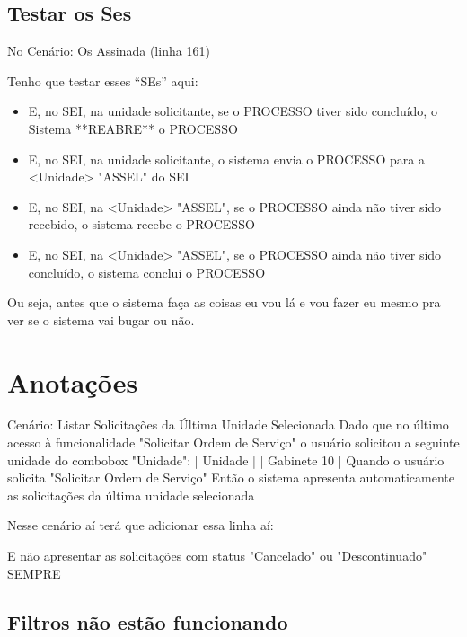 \subsection{Testar os Ses}

No Cenário: Os Assinada (linha 161)

Tenho que testar esses ``SEs'' aqui:

\begin{itemize}
	\item E, no SEI, na unidade solicitante, se o PROCESSO tiver sido concluído, o Sistema **REABRE** o PROCESSO
	
	\item E, no SEI, na unidade solicitante, o sistema envia o PROCESSO para a <Unidade> "ASSEL" do SEI
	
	\item E, no SEI, na <Unidade> "ASSEL", se o PROCESSO ainda não tiver sido recebido, o sistema recebe o PROCESSO
	
	\item E, no SEI, na <Unidade> "ASSEL", se o PROCESSO ainda não tiver sido concluído, o sistema conclui o PROCESSO
\end{itemize}

Ou seja, antes que o sistema faça as coisas eu vou lá e vou fazer eu mesmo pra ver se o sistema vai bugar ou não.







\section{Anotações}

Cenário: Listar Solicitações da Última Unidade Selecionada
Dado que no último acesso à funcionalidade "Solicitar Ordem de Serviço" o usuário solicitou a seguinte unidade do combobox "Unidade":
| Unidade     |
| Gabinete 10 |
Quando o usuário solicita "Solicitar Ordem de Serviço"
Então o sistema apresenta automaticamente as solicitações da última unidade selecionada


Nesse cenário aí terá que adicionar essa linha aí:

E não apresentar as solicitações com status "Cancelado" ou "Descontinuado" SEMPRE



\subsection{Filtros não estão funcionando}

